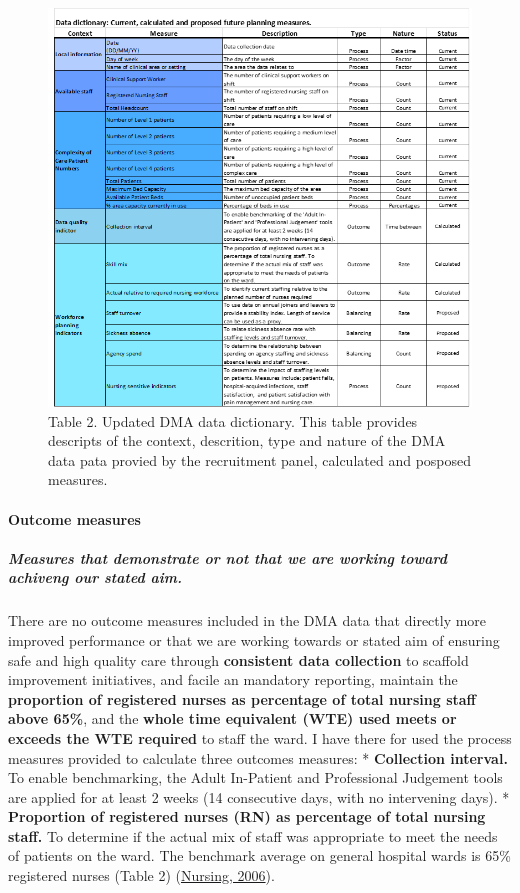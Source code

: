 \documentclass[
]{article}
\begin{document}
\begin{figure}
\centering
\includegraphics{./../../Output/Visuals/UpdatedDataDictionary.png}
\caption{Table 2. Updated DMA data dictionary. This table provides
descripts of the context, descrition, type and nature of the DMA data
pata provied by the recruitment panel, calculated and posposed
measures.}
\end{figure}

\hypertarget{outcome-measures}{%
\paragraph{Outcome measures}\label{outcome-measures}}

\hypertarget{measures-that-demonstrate-or-not-that-we-are-working-toward-achiveng-our-stated-aim.}{%
\subparagraph{Measures that demonstrate or not that we are working
toward achiveng our stated
aim.}\label{measures-that-demonstrate-or-not-that-we-are-working-toward-achiveng-our-stated-aim.}}

There are no outcome measures included in the DMA data that directly
more improved performance or that we are working towards or stated aim
of ensuring safe and high quality care through \textbf{consistent data
collection} to scaffold improvement initiatives, and facile an mandatory
reporting, maintain the \textbf{proportion of registered nurses as
percentage of total nursing staff above 65\%}, and the \textbf{whole
time equivalent (WTE) used meets or exceeds the WTE required} to staff
the ward. I have there for used the process measures provided to
calculate three outcomes measures: * \textbf{Collection interval.} To
enable benchmarking, the Adult In-Patient and Professional Judgement
tools are applied for at least 2 weeks (14 consecutive days, with no
intervening days). * \textbf{Proportion of registered nurses (RN) as
percentage of total nursing staff.} To determine if the actual mix of
staff was appropriate to meet the needs of patients on the ward. The
benchmark average on general hospital wards is 65\% registered nurses
(Table 2)
(\protect\hyperlink{ref-royalcollegeofnursingRCNPolicyUnit2006}{Nursing,
2006}).
\end{document}
